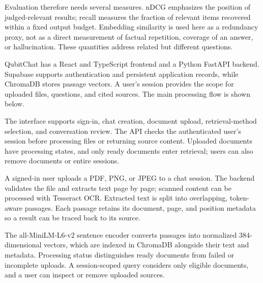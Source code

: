 \documentclass[11pt,a4paper]{article}
\newcommand{\reportheading}[1]{\par\vspace{4pt}{\large\bfseries #1}\par\vspace{1pt}}
\newcommand{\reportsubheading}[1]{\par\vspace{2pt}{\normalsize\bfseries #1}\par}
\begin{document}
Evaluation therefore needs several measures. nDCG emphasizes the position of judged-relevant results; recall measures the fraction of relevant items recovered within a fixed output budget. Embedding similarity is used here as a redundancy proxy, not as a direct measurement of factual repetition, coverage of an answer, or hallucination. These quantities address related but different questions.

\reportheading{3. System Model}
QubitChat has a React and TypeScript frontend and a Python FastAPI backend. Supabase supports authentication and persistent application records, while ChromaDB stores passage vectors. A user's session provides the scope for uploaded files, questions, and cited sources. The main processing flow is shown below.

\par\endgroup
\newpage
The interface supports sign-in, chat creation, document upload, retrieval-method selection, and conversation review. The API checks the authenticated user's session before processing files or returning source content. Uploaded documents have processing states, and only ready documents enter retrieval; users can also remove documents or entire sessions.

\begin{center}
\setlength{\fboxsep}{5pt}
\end{center}
\reportsubheading{3.1 Document ingestion and indexing}
A signed-in user uploads a PDF, PNG, or JPEG to a chat session. The backend validates the file and extracts text page by page; scanned content can be processed with Tesseract OCR. Extracted text is split into overlapping, token-aware passages. Each passage retains its document, page, and position metadata so a result can be traced back to its source.

The all-MiniLM-L6-v2 sentence encoder converts passages into normalized 384-dimensional vectors, which are indexed in ChromaDB alongside their text and metadata. Processing status distinguishes ready documents from failed or incomplete uploads. A session-scoped query considers only eligible documents, and a user can inspect or remove uploaded sources.
\end{document}
